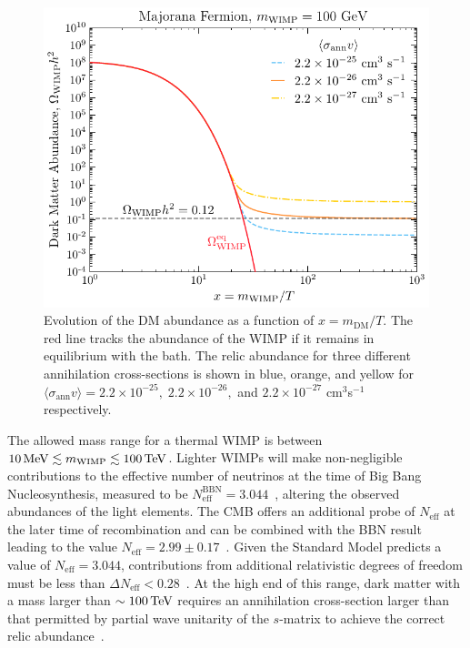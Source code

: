 \begin{figure}[t!]
    \centering
    \includegraphics{fig_dm_freezeout.pdf}
    \caption[Evolution of the DM abundance as a function of $x = m_\mathrm{DM}/T$.]{Evolution of the DM abundance as a function of $x = m_\mathrm{DM}/T$. The red line tracks the abundance of the WIMP if it remains in equilibrium with the bath. The relic abundance for three different annihilation cross-sections is shown in blue, orange, and yellow for $\langle \sigma_\mathrm{ann} v\rangle = 2.2\times10^{-25},\;2.2\times10^{-26},$ and $2.2\times10^{-27}$ cm$^{3}$s$^{-1}$ respectively.}
    \label{ch1:fig:WIMP_freezeout}
\end{figure}

The allowed mass range for a thermal WIMP is between $10{\rm \,MeV}\lesssim m_\mathrm{WIMP} \lesssim 100{\rm \,TeV}$. Lighter WIMPs will make non-negligible contributions to the effective number of neutrinos at the time of Big Bang Nucleosynthesis, measured to be $N^\mathrm{BBN}_\mathrm{eff} = 3.044$~\cite{Yeh:2022heq_oct_Probingphysicsstandard}, altering the observed abundances of the light elements. The CMB offers an additional probe of $N_\mathrm{eff}$ at the later time of recombination and can be combined with the BBN result leading to the value $N_\mathrm{eff} = 2.99 \pm 0.17$~\cite{Planck:2018vyg_sep_Planck2018results}. Given the Standard Model predicts a value of $N_\mathrm{eff} = 3.044$, contributions from additional relativistic degrees of freedom must be less than $\Delta N_\mathrm{eff} < 0.28$~\cite{Yeh:2022heq_oct_Probingphysicsstandard}.  
At the high end of this range, dark matter with a mass larger than $\sim 100{\rm \,TeV}$ requires an annihilation cross-section larger than that permitted by partial wave unitarity of the $s$-matrix to achieve the correct relic abundance~\cite{Griest:1989wd_UnitarityLimitsMass}.  
 

